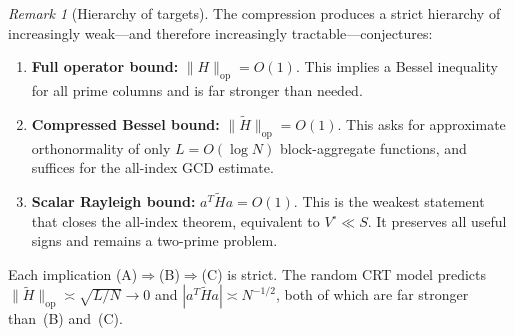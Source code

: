 \documentclass[11pt]{article}
\theoremstyle{definition}
\theoremstyle{remark}
\newtheorem{remark}[theorem]{Remark}
\begin{document}
\begin{remark}[Hierarchy of targets]
\label{rem:hierarchy}
The compression produces a strict hierarchy
of increasingly weak---and therefore increasingly
tractable---conjectures:
\begin{enumerate}
\item[\textup{(A)}]
  \textbf{Full operator bound:}
  $\|H\|_{\mathrm{op}} = O(1)$.
  This implies a Bessel inequality for all
  prime columns and is far stronger than needed.
\item[\textup{(B)}]
  \textbf{Compressed Bessel bound:}
  $\|\tilde{H}\|_{\mathrm{op}} = O(1)$.
  This asks for approximate orthonormality of
  only $L = O(\log N)$ block-aggregate functions,
  and suffices for the all-index GCD estimate.
\item[\textup{(C)}]
  \textbf{Scalar Rayleigh bound:}
  $a^T\tilde{H}a = O(1)$.
  This is the weakest statement that closes
  the all-index theorem, equivalent to
  $V^\circ \ll S$.
  It preserves all useful signs and remains
  a two-prime problem.
\end{enumerate}
Each implication (A)$\Rightarrow$(B)$\Rightarrow$(C)
is strict. The random CRT model predicts
$\|\tilde{H}\|_{\mathrm{op}} \asymp \sqrt{L/N} \to 0$
and $|a^T\tilde{H}a| \asymp N^{-1/2}$,
both of which are far stronger than~(B) and~(C).
\end{remark}
\end{document}
